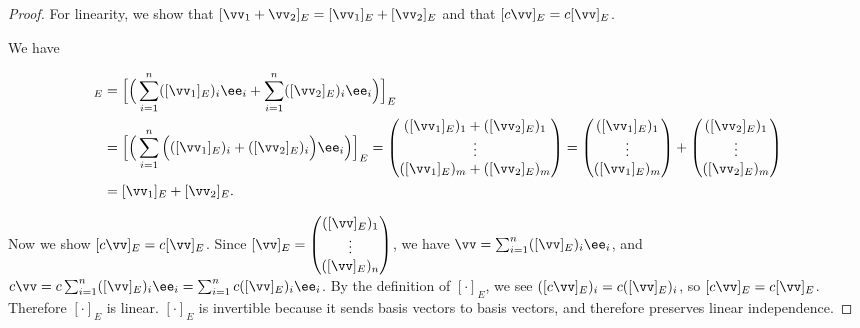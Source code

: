 \begin{proof}
    For linearity, we show that $[\vv_1 + \vv_2]_E = [\vv_1]_E + [\vv_2]_E$ and that $[c\vv]_E = c[\vv]_E$.
    
    We have
        
    \begin{align*}
        [\vv_1 + \vv_2]_E
        &= \Big[\Big(\sum_{i = 1}^n ([\vv_1]_E)_i \ee_i + \sum_{i = 1}^n ([\vv_2]_E)_i \ee_i\Big)\Big]_E \\
        &= \Big[\Big(\sum_{i = 1}^n \Big(([\vv_1]_E)_i + ([\vv_2]_E)_i \Big) \ee_i \Big)\Big]_E
        = 
        \begin{pmatrix} ([\vv_1]_E)_1 + ([\vv_2]_E)_1 \\ \vdots \\ ([\vv_1]_E)_m + ([\vv_2]_E)_m \end{pmatrix}
        =
        \begin{pmatrix} ([\vv_1]_E)_1 \\ \vdots \\ ([\vv_1]_E)_m \end{pmatrix}
        +
        \begin{pmatrix} ([\vv_2]_E)_1 \\ \vdots \\ ([\vv_2]_E)_m \end{pmatrix} \\
        &= [\vv_1]_E + [\vv_2]_E.
    \end{align*}
        
    Now we show $[c \vv]_E = c [\vv]_E$. Since $[\vv]_E = \begin{pmatrix} ([\vv]_E)_1 \\ \vdots \\ ([\vv]_E)_n \end{pmatrix}$, we have $\vv = \sum_{i = 1}^n ([\vv]_E)_i \ee_i$, and $c \vv = c \sum_{i = 1}^n ([\vv]_E)_i \ee_i = \sum_{i = 1}^n c ([\vv]_E)_i \ee_i$. By the definition of $[\cdot]_E$, we see $([c \vv]_E)_i = c ([\vv]_E)_i$, so $[c \vv]_E = c [\vv]_E$. Therefore $[\cdot]_E$ is linear. $[\cdot]_E$ is invertible because it sends basis vectors to basis vectors, and therefore preserves linear independence.

\end{proof}

\newpage

